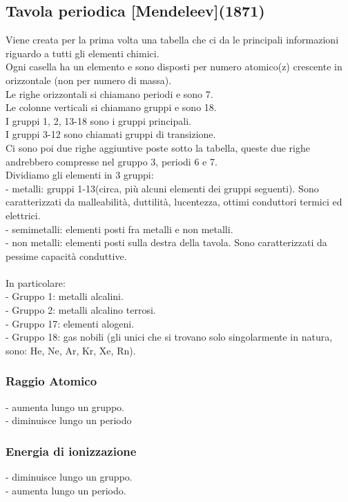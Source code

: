 \subsection{Tavola periodica [Mendeleev](1871)}
Viene creata per la prima volta una tabella che ci da le principali informazioni riguardo a tutti gli elementi chimici.\\
Ogni casella ha un elemento e sono disposti per numero atomico(z) crescente in orizzontale (non per numero di massa).\\
Le righe orizzontali si chiamano periodi e sono 7.\\
Le colonne verticali si chiamano gruppi e sono 18.\\
I gruppi 1, 2, 13-18 sono i gruppi principali.\\
I gruppi 3-12 sono chiamati gruppi di transizione.\\
Ci sono poi due righe aggiuntive poste sotto la tabella, queste due righe andrebbero compresse nel gruppo 3, periodi 6 e 7.\\
Dividiamo gli elementi in 3 gruppi:\\
- metalli: gruppi 1-13(circa, più alcuni elementi dei gruppi seguenti). Sono caratterizzati da malleabilità, duttilità, lucentezza, ottimi conduttori termici ed elettrici.\\
- semimetalli: elementi posti fra metalli e non metalli.\\
- non metalli: elementi posti sulla destra della tavola. Sono caratterizzati da pessime capacità conduttive.\\\\
In particolare:\\
- Gruppo 1: metalli alcalini.\\
- Gruppo 2: metalli alcalino terrosi.\\
- Gruppo 17: elementi alogeni. \\
- Gruppo 18: gas nobili (gli unici che si trovano solo singolarmente in natura, sono: He, Ne, Ar, Kr, Xe, Rn).
\subsubsection{Raggio Atomico}
- aumenta lungo un gruppo.\\
- diminuisce lungo un periodo
\subsubsection{Energia di ionizzazione}
- diminuisce lungo un gruppo.\\
- aumenta lungo un periodo.
